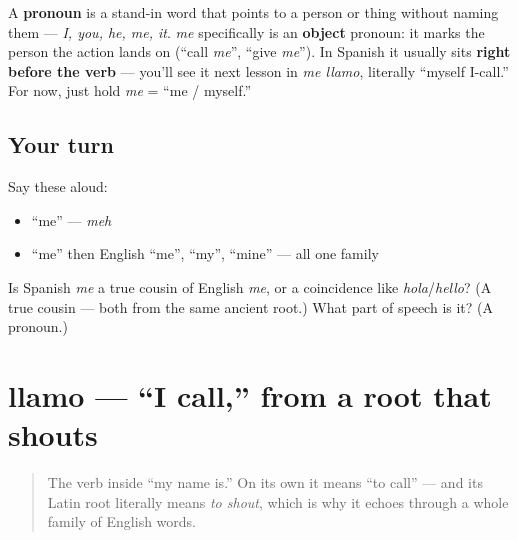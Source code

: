 \begin{grammarlens}[title={Grammar Lens: what a pronoun is}]
A \textbf{pronoun} is a stand-in word that points to a person or thing without naming them — \emph{I, you, he, me, it}. \emph{me} specifically is an \textbf{object} pronoun: it marks the person the action lands on (\textquotedblleft{}call \emph{me}\textquotedblright{}, \textquotedblleft{}give \emph{me}\textquotedblright{}). In Spanish it usually sits \textbf{right before the verb} — you'll see it next lesson in \emph{me llamo}, literally \textquotedblleft{}myself I-call.\textquotedblright{} For now, just hold \emph{me} = \textquotedblleft{}me / myself.\textquotedblright{}
\end{grammarlens}

\subsection*{Your turn}
Say these aloud:

\begin{itemize}
\raggedright
  \item \textquotedblleft{}me\textquotedblright{} — \emph{meh}
  \item \textquotedblleft{}me\textquotedblright{} then English \textquotedblleft{}me\textquotedblright{}, \textquotedblleft{}my\textquotedblright{}, \textquotedblleft{}mine\textquotedblright{} — all one family
\end{itemize}

\begin{tcolorbox}[breakable,colback=teal!4,colframe=teal!35!black,title={Before you move on}]
Is Spanish \emph{me} a true cousin of English \emph{me}, or a coincidence like \emph{hola}/\emph{hello}? (A true cousin — both from the same ancient root.) What part of speech is it? (A pronoun.)
\end{tcolorbox}
\section[llamo]{llamo — \textquotedblleft{}I call,\textquotedblright{} from a root that shouts}

\label{lesson:ES-C03-llamar}



\begin{quote}
The verb inside \textquotedblleft{}my name is.\textquotedblright{} On its own it means \textquotedblleft{}to call\textquotedblright{} — and its Latin root literally means \emph{to shout}, which is why it echoes through a whole family of English words.
\end{quote}

